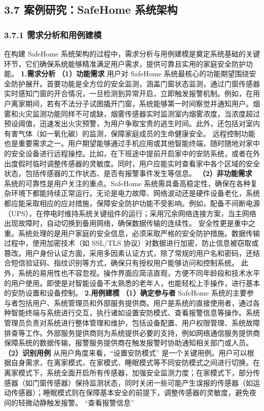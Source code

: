 \subsection{3.7 案例研究：SafeHome 系统架构}\label{ux6848ux4f8bux7814ux7a76safehome-ux7cfbux7edfux67b6ux6784} \subsubsection{3.7.1 需求分析和用例建模}\label{ux9700ux6c42ux5206ux6790ux548cux7528ux4f8bux5efaux6a21} 在构建 SafeHome 系统架构的过程中，需求分析与用例建模是奠定系统基础的关键环节，它们确保系统能够精准满足用户需求，提供可靠且实用的家庭安全防护功能。 \textbf{1.需求分析} \textbf{（1）功能需求} 用户对 SafeHome 系统最核心的功能期望围绕安全防护展开。首要功能是全方位的安全监测，涵盖门窗状态监测，通过门窗传感器实时感知门窗的开合情况，一旦检测到异常开启，立即触发报警机制。例如，在用户离家期间，若有不法分子试图撬开门窗，系统能够第一时间察觉并通知用户。烟雾和火灾监测功能同样不可或缺，烟雾传感器实时监测室内烟雾浓度，当浓度超过预设阈值，迅速发出火灾预警，为用户争取宝贵的逃生时间。此外，还包括对室内有害气体（如一氧化碳）的监测，保障家庭成员的生命健康安全。 远程控制功能也是重要需求之一。用户期望能够通过手机应用或其他智能终端，随时随地对家中的安全设备进行远程操控。比如，在下班途中提前开启家中的安防系统，或者在外出度假时临时调整传感器的灵敏度。同时，用户应能实时查看家中各个区域的安全状态，包括传感器的工作状态、是否有报警事件发生等信息。 \textbf{（2）非功能需求} 系统的可靠性是用户关注的重点。SafeHome 系统需具备高稳定性，确保在各种复杂环境下都能持续正常运行。无论是电力故障、网络波动还是硬件设备老化，系统都应能采取相应的应对措施，保障安全防护功能不受影响。例如，配备不间断电源（UPS），在停电时维持系统关键组件的运行；采用冗余网络连接方案，当主网络出现故障时，自动切换到备用网络，确保数据传输的连续性。 安全性更是重中之重。系统处理的是用户家庭的安全信息，必须采取严格的安全防护措施。数据传输过程中，使用加密技术（如 SSL/TLS 协议）对数据进行加密，防止信息被窃取或篡改。用户身份认证方面，采用多因素认证方式，除了常规的用户名和密码，还结合短信验证码、指纹识别等方式，确保只有授权用户能够访问和控制系统。 此外，系统的易用性也不容忽视。操作界面应简洁直观，方便不同年龄段和技术水平的用户使用。即使是对智能设备不太熟悉的老年人，也能轻松上手操作，进行基本的安防设置和设备控制。 \textbf{2.用例建模} \textbf{（1）确定参与者} SafeHome 系统的主要参与者包括用户、系统管理员和外部服务提供商。用户是系统的直接使用者，通过各种智能终端与系统进行交互，执行诸如设置安防模式、查看报警信息等操作。系统管理员负责对系统进行整体管理和维护，包括设备配置、用户权限管理、系统故障排查等工作。外部服务提供商则为系统提供必要的支持，例如网络通信服务提供商保障系统的数据传输，报警服务提供商在触发报警时协助通知相关部门或人员。 \textbf{（2）识别用例} 从用户角度来看，``设置安防模式'' 是一个关键用例。用户可以根据自身需求，在离家模式、在家模式、睡眠模式等不同安防模式之间进行切换。在离家模式下，系统全面开启所有传感器，加强安全监测力度；在家模式下，部分传感器（如门窗传感器）保持监测状态，同时关闭一些可能产生误报的传感器（如运动传感器）；睡眠模式则在保障基本安全的前提下，调整传感器的灵敏度，避免夜间的轻微动静触发报警。 ``查看报警信息'' 
